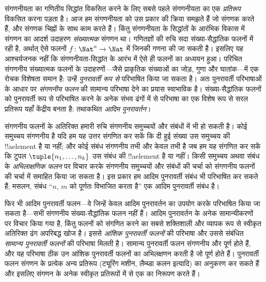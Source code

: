 \documentclass[../../../include/open-logic-section]{subfiles}
\begin{document}

संगणनीयता का गणितीय सिद्धांत विकसित करने के लिए सबसे पहले संगणनीयता का
एक \emph{प्रतिरूप} विकसित करना पड़ता है। आज हम संगणनीयता को उस प्रकार की
क्रिया समझते हैं जो संगणक करते हैं, और संगणक चिह्नों के साथ काम करते हैं।
किंतु संगणनीयता के सिद्धांतों के आरंभिक विकास में संगणन का आदर्श उदाहरण
\emph{संख्यात्मक} संगणन था। गणितज्ञों की रुचि सदा संख्या-सैद्धांतिक फलनों
में रही है, अर्थात् ऐसे फलनों $f\colon \Nat^n \to
\Nat$ में जिनकी गणना की जा सकती है। इसलिए यह आश्चर्यजनक नहीं कि
संगणनीयता-सिद्धांत के आरंभ में ऐसे ही फलनों का अध्ययन हुआ। परिचित
संगणनीय संख्यात्मक फलनों के उदाहरणों---जैसे प्राकृतिक संख्याओं का जोड़,
गुणा और घातांक---में एक रोचक विशेषता समान है: उन्हें \emph{पुनरावर्ती रूप
से} परिभाषित किया जा सकता है। अतः पुनरावर्ती परिभाषाओं के आधार पर
\emph{संगणनीय फलन} की सामान्य परिभाषा देने का प्रयास स्वाभाविक है।
संख्या-सैद्धांतिक फलनों को पुनरावर्ती रूप से परिभाषित करने के अनेक संभव
ढंगों में से परिभाषा का एक विशेष रूप से सरल प्रतिरूप यहाँ केंद्रीय बनता
है: तथाकथित \emph{आदिम पुनरावर्तन}।

संगणनीय फलनों के अतिरिक्त हमारी रुचि संगणनीय समुच्चयों और संबंधों में भी
हो सकती है। कोई समुच्चय संगणनीय है यदि हम यह उत्तर संगणित कर सकें कि दी
हुई संख्या उस समुच्चय की !!a{element} है या नहीं; और कोई संबंध संगणनीय
तभी और केवल तभी है जब हम यह संगणित कर सकें कि टुपल
$\tuple{n_1, \dots, n_k}$ उस संबंध की !!a{element} है या नहीं। किसी
समुच्चय अथवा संबंध के \emph{अभिलाक्षणिक फलन} पर विचार करके संगणनीय
समुच्चयों और संबंधों की चर्चा को संगणनीय फलनों की चर्चा में समाहित किया
जा सकता है। इस प्रकार हम आदिम पुनरावर्ती संबंध भी परिभाषित कर सकते हैं;
मसलन, संबंध ``$n$, $m$ को पूर्णतः विभाजित करता है'' एक आदिम पुनरावर्ती
संबंध है।

फिर भी आदिम पुनरावर्ती फलन---वे जिन्हें केवल आदिम पुनरावर्तन का उपयोग
करके परिभाषित किया जा सकता है---सभी संगणनीय संख्या-सैद्धांतिक फलन नहीं
हैं। आदिम पुनरावर्तन के अनेक सामान्यीकरणों पर विचार किया गया है, किंतु
फलनों को संगणित करने का सबसे शक्तिशाली और व्यापक रूप से स्वीकृत अतिरिक्त
ढंग अपरिबद्ध खोज है। इससे \emph{आंशिक पुनरावर्ती फलनों} की परिभाषा और
उससे संबंधित \emph{सामान्य पुनरावर्ती फलनों} की परिभाषा मिलती है। सामान्य
पुनरावर्ती फलन संगणनीय और पूर्ण होते हैं, और यह परिभाषा ठीक उन आंशिक
पुनरावर्ती फलनों का अभिलक्षणन करती है जो पूर्ण होते हैं। पुनरावर्ती फलन
संगणन के प्रत्येक अन्य प्रतिरूप (ट्यूरिंग मशीन, लैम्ब्डा कलन इत्यादि) का
अनुकरण कर सकते हैं और इसलिए संगणन के अनेक स्वीकृत प्रतिरूपों में से एक
का निरूपण करते हैं।
\end{document}
